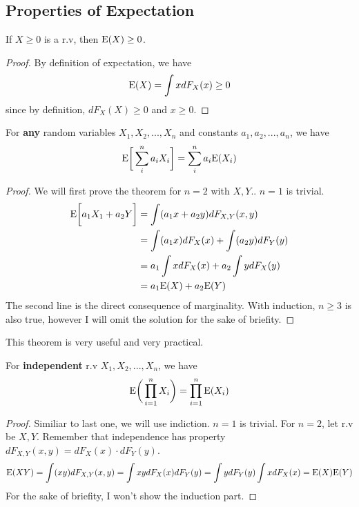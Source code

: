 \subsection*{Properties of Expectation}
\begin{theorem} If $X \ge 0$ is a r.v, then ${\operatorname{E}} (X) \ge 0$.
    \begin{proof}
        By definition of expectation, we have
        \[ {\operatorname{E}}(X) = \int x dF_X(x)  \ge 0 \]
        since by definition, $dF_X(X) \ge 0$ and $x \ge 0$.
    \end{proof}
\end{theorem}
\begin{theorem}[Linearity] For \textbf{any} random variables $X_1,X_2,...,X_n$ and constants $a_1,a_2,...,a_n$, we have 
    \[{\operatorname{E}} \bigg[ \sum^n_i a_iX_i \bigg] = \sum^n_i a_i{\operatorname{E}}({X_i})\]
    \begin{proof}
        We will first prove the theorem for $n=2$ with $X,Y$.. $n=1$ is trivial.
        \begin{align*}
            {\operatorname{E}} \bigg[ a_1X_1 + a_2Y\bigg] &= \int (a_1x+a_2y) dF_{X,Y}(x,y) \\
                                            &=\int (a_1x)dF_{X}(x) + \int (a_2y)dF_{Y}(y)\\
                                            &= a_1\int x dF_{X}(x) + a_2 \int y dF_{X}(y) \\
                                            &= a_1{\operatorname{E}}(X) + a_2{\operatorname{E}}(Y)
        \end{align*}
        The second line is the direct consequence of marginality.
        With induction, $n\ge 3$ is also true, however I will omit the solution for the sake of briefity.
    \end{proof}
    This theorem is very useful and very practical.
\end{theorem}
\begin{theorem}[multiplicity]
    For \textbf{independent} r.v $X_1,X_2,...,X_n$,  we have
    \[{\operatorname{E}} \bigg( \prod _{i=1}^nX_i \bigg) = \prod_{i=1}^n {\operatorname{E}}(X_i)\]
    \begin{proof}
        Similiar to last one, we will use indiction. $n=1$ is trivial. For $n=2$, let r.v be $X,Y$. Remember that independence has property $dF_{X,Y}(x,y)= dF_{X}(x)\cdot dF_{Y}(y)$.
        \[{\operatorname{E}}(XY) = \int (xy)dF_{X,Y}(x,y) = \int xydF_{X}(x)dF_{Y}(y)= \int ydF_Y(y)\int xdF_X(x)= {\operatorname{E}}(X){\operatorname{E}}(Y)\]
        For the sake of briefity, I won't show the induction part.
    \end{proof}
\end{theorem}
